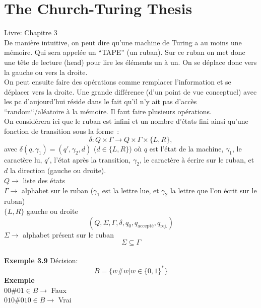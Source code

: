 \documentclass[a4paper,12pt]{article}
\begin{document}
\section{The Church-Turing Thesis}
  Livre: Chapitre 3\\
  De manière intuitive, on peut dire qu'une machine de Turing a au moins une mémoire.  Qui sera appelée un ``TAPE'' (un ruban).  Sur ce ruban on met donc une tête de lecture (head) pour lire les éléments un à un.  On se déplace donc vers la gauche ou vers la droite.\\
  On peut ensuite faire des opérations comme remplacer l'information et se déplacer vers la droite.  Une grande différence (d'un point de vue conceptuel) avec les pc d'aujourd'hui réside dans le fait qu'il n'y ait pas d'accès ``random``/aléatoire à la mémoire.  Il faut faire plusieurs opérations.\\
  On considérera ici que le ruban est infini et un nombre d'états fini ainsi qu'une fonction de transition sous la forme~:
  $$\delta : Q \times \Gamma \rightarrow Q \times \Gamma \times \{L, R\},$$
	avec $\delta(q, \gamma_1) = (q', \gamma_2, d)$ ($d \in \{L, R\}$) où $q$ est l'état de la machine, $\gamma_1$, le caractère lu,
	$q'$, l'état après la transition, $\gamma_2$, le caractère à écrire sur le ruban, et $d$ la direction (gauche ou droite).\\
  $Q \rightarrow$ liste des états\\
  $\Gamma \rightarrow$ alphabet sur le ruban ($\gamma_1$ est la lettre lue, et $\gamma_2$ la lettre que l'on écrit sur le ruban)\\
  $\{L, R\}$ gauche ou droite\\
  $$(Q, \Sigma, \Gamma, \delta, q_0, q_{\text{accepté}}, q_{\text{rej.}})$$
  $\Sigma \rightarrow$ alphabet présent sur le ruban\\
  $$\Sigma \subseteq \Gamma$$\\
  \textbf{Exemple 3.9}
  Décision:
  $$B = \{w \# w | w \in \{0, 1\}^*\}$$
  \textbf{Exemple}\\
  $00\#01 \in B \rightarrow$ Faux\\
  $010\#010 \in B \rightarrow$ Vrai\\
  \\
\end{document}
